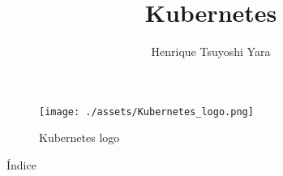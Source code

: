 \documentclass{beamer}
\title {Kubernetes}
\author {Henrique Tsuyoshi Yara}
\institute {OPUS-software}
\begin{document}
\begin{frame}{\titlepage}
	\begin{figure}[htpb]
		\centering
		\texttt{[image: ./assets/Kubernetes\_logo.png]}
		\caption{Kubernetes logo}
	\end{figure}
\end{frame}

\begin{frame}{Índice}
\begin{multicols}{2}
  \tableofcontents
\end{multicols}
\end{frame}




\end{document}
